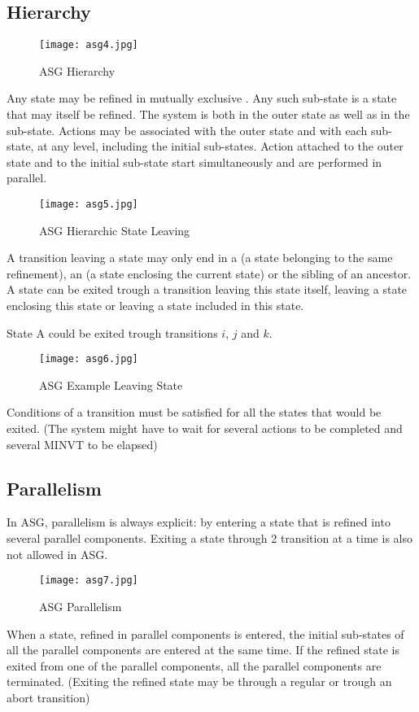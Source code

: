 \documentclass[../main.tex]{subfiles}
\begin{document}
\subsection{Hierarchy}
\begin{figure}[H]
    \centering
    \texttt{[image: asg4.jpg]}
    \caption{ASG Hierarchy}
    \label{asg4}
\end{figure}
Any state may be refined in mutually exclusive .
Any such sub-state is a state that may itself be refined.
The system is both in the outer state as well as in the sub-state.
Actions may be associated with the outer state and with each sub-state, at any level, including the initial sub-states.
Action attached to the outer state and to the initial sub-state start simultaneously and are performed in parallel.
\begin{figure}[H]
    \centering
    \texttt{[image: asg5.jpg]}
    \caption{ASG Hierarchic State Leaving}
    \label{asg5}
\end{figure}
A transition leaving a state may only end in a  (a state belonging to the same refinement), an  (a state enclosing the current state) or the sibling of an ancestor.
A state can be exited trough a transition leaving this state itself, leaving a state enclosing this state or leaving a state included in this state.
\begin{exmp}
State A could be exited trough transitions $i$, $j$ and $k$.
\begin{figure}[H]
    \centering
    \texttt{[image: asg6.jpg]}
    \caption{ASG Example Leaving State}
    \label{asg6}
\end{figure}
\end{exmp}
Conditions of a transition must be satisfied for all the states that would be exited.
(The system might have to wait for several actions to be completed and several MINVT to be elapsed)

\subsection{Parallelism}
In ASG, parallelism is always explicit: by entering a state that is refined into several parallel components. Exiting a state through 2 transition at a time is also not allowed in ASG.

\begin{figure}[H]
    \centering
    \texttt{[image: asg7.jpg]}
    \caption{ASG Parallelism}
    \label{asg6}
\end{figure}
When a state, refined in parallel components is entered, the initial sub-states of all the parallel components are entered at the same time.
If the refined state is exited from one of the parallel components, all the parallel components are terminated.
(Exiting the refined state may be through a regular or trough an abort transition)
\end{document}
